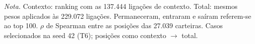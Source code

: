 \begin{table}[htbp]
\centering
\footnotesize
\caption{Ranking do dia real: contexto versus cobertura total (top 100)}
\label{tab:t5}
\par\smallskip\parbox{\linewidth}{\scriptsize\textit{Nota.} Contexto: ranking com as 137.444 ligações de contexto. Total: mesmos pesos aplicados às 229.072 ligações. Permaneceram, entraram e saíram referem-se ao top 100. $\rho$ de Spearman entre as posições das 27.039 carteiras. Casos selecionados na seed 42 (T6); posições como contexto $\rightarrow$ total.}
\end{table}
